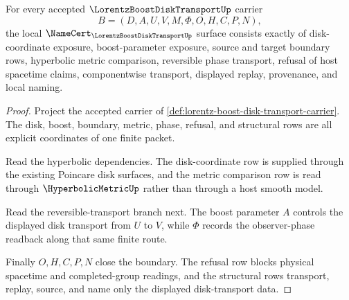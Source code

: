 \begin{theorem}
\label{thm:lorentz-boost-disk-transport-namecert-obligations}
For every accepted $\LorentzBoostDiskTransportUp$ carrier
$$
B=(D,A,U,V,M,\Phi,O,H,C,P,N),
$$
the local $\NameCert_{\LorentzBoostDiskTransportUp}$ surface consists exactly of disk-coordinate exposure, boost-parameter exposure, source and target boundary rows, hyperbolic metric comparison, reversible phase transport, refusal of host spacetime claims, componentwise transport, displayed replay, provenance, and local naming.
\end{theorem}
\begin{proof}
Project the accepted carrier of \autoref{def:lorentz-boost-disk-transport-carrier}. The disk, boost, boundary, metric, phase, refusal, and structural rows are all explicit coordinates of one finite packet.

Read the hyperbolic dependencies. The disk-coordinate row is supplied through the existing Poincare disk surfaces, and the metric comparison row is read through $\HyperbolicMetricUp$ rather than through a host smooth model.

Read the reversible-transport branch next. The boost parameter $A$ controls the displayed disk transport from $U$ to $V$, while $\Phi$ records the observer-phase readback along that same finite route.

Finally $O,H,C,P,N$ close the boundary. The refusal row blocks physical spacetime and completed-group readings, and the structural rows transport, replay, source, and name only the displayed disk-transport data.
\end{proof}

